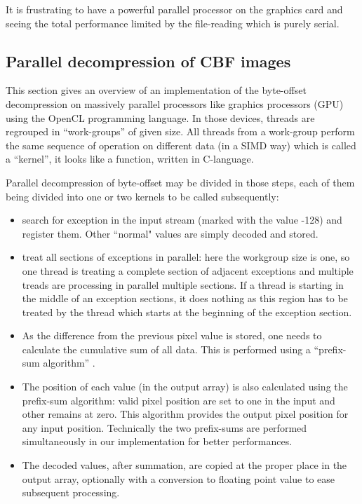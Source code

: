 \documentclass[preprint]{iucr}              %
\begin{document}
It is frustrating to have a powerful parallel processor on the
graphics card and seeing the total performance limited by the file-reading
which is purely serial.

\subsection{Parallel decompression of CBF images}
 
This section gives an overview of an implementation of the byte-offset
decompression on massively parallel processors like graphics processors
(GPU) using the OpenCL \cite{opencl} programming language.
In those devices, threads are regrouped in ``work-groups'' of given size. 
All threads from a work-group perform the same sequence of operation on
different data (in a SIMD way) which is called a ``kernel'', it looks like a
function, written in C-language.

Parallel decompression of byte-offset may be divided in those steps,
each of them being divided into one or two kernels to be called subsequently:
\begin{itemize}
  \item search for exception in the input stream (marked with the value -128)
  and register them. Other ``normal" values are simply decoded and stored.
  \item treat all sections of exceptions in parallel: here the workgroup size is
  one, so one thread is treating a complete section of adjacent exceptions
  and multiple treads are processing in parallel multiple sections. If a thread
  is starting in the middle of an exception sections, it does nothing as this
  region has to be treated by the thread which starts at the beginning of the 
  exception section.
  \item As the difference from the previous pixel value is stored, one needs to
  calculate the cumulative sum of all data. This is performed using a
  ``prefix-sum algorithm'' \cite{scan}.
  \item The position of each value (in the output array) is also calculated
  using the prefix-sum algorithm: valid pixel position are set to one in the
  input and other remains at zero. This algorithm provides the output pixel
  position for any input position.
  Technically the two prefix-sums are performed simultaneously in our
  implementation for better performances.
  \item The decoded values, after summation, are copied at the proper place in
  the output array, optionally with a conversion to floating point value to
  ease subsequent processing.
\end{itemize} 
\end{document}

